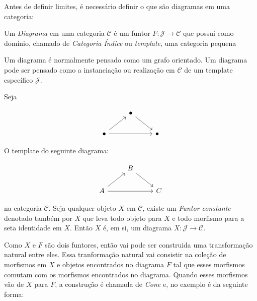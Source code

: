 \documentclass[../main.tex]{subfiles}
\begin{document}
Antes de definir limites, é necessário definir o que são diagramas em uma categoria:

\begin{definition}
    Um \emph{Diagrama} em uma categoria $\mathcal{C}$ é um funtor $F : \mathcal{J} \to \mathcal{C}$ que possui como domínio, chamado de \emph{Categoria Índice} ou \emph{template}, uma categoria pequena
\end{definition}

Um diagrama é normalmente pensado como um grafo orientado. Um diagrama pode ser pensado como a instanciação ou realização em $\mathcal{C}$ de um template específico $\mathcal{J}$.

Seja 

\[\begin{tikzcd}
	& \bullet \\
	\bullet && \bullet
	\arrow[from=1-2, to=2-3]
	\arrow[from=2-1, to=1-2]
	\arrow[from=2-1, to=2-3]
\end{tikzcd}\]

O template do seguinte diagrama:

\[\begin{tikzcd}
	& B \\
	A && C
	\arrow[from=1-2, to=2-3]
	\arrow[from=2-1, to=1-2]
	\arrow[from=2-1, to=2-3]
\end{tikzcd}\]

na categoria $\mathcal{C}$. Seja qualquer objeto $X$ em $\mathcal{C}$, existe um \emph{Funtor constante} denotado também por $X$ que leva todo objeto para $X$ e todo morfismo para a seta identidade em $X$. Então $X$ é, em si, um diagrama $X : \mathcal{J} \to \mathcal{C}$.

Como $X$ e $F$ são dois funtores, então vai pode ser construida uma transformação natural entre eles. Essa tranformação natural vai consistir na coleção de morfismos em $X$ e objetos encontrados no diagrama $F$ tal que esses morfismos comutam com os morfismos encontrados no diagrama. Quando esses morfismos vão de $X$ para $F$, a construção é chamada de \emph{Cone} e, no exemplo é da seguinte forma:

\end{document}
